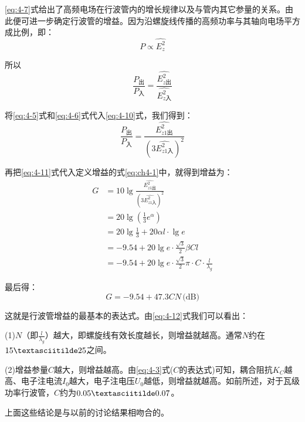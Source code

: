 \eqref{eq:4-7}式给出了高频电场在行波管内的增长规律以及与管内其它参量的关系。由此便可进一步确定行波管的增益。因为沿螺旋线传播的高频功率与其轴向电场平方成比例，即：
\begin{equation} \label{eq:4-9}
	P \propto \hat{E_z^2}
\end{equation}

所以
\begin{equation} \label{eq:4-10}
	\frac{P_\textrm{出}}{P_\textrm{入}} = \frac{\hat{E_{z\textrm{出}}^2}}{\hat{E_{z\textrm{入}}^2}}
\end{equation}

将\eqref{eq:4-5}式和\eqref{eq:4-6}式代入\eqref{eq:4-10}式，我们得到：
\begin{equation} \label{eq:4-11}
	\frac{P_\textrm{出}}{P_\textrm{入}} = \frac{\hat{E_{z1\textrm{出}}^2}}{(3\hat{E_{z1\textrm{入}}^2} )^2}
\end{equation}

再把\eqref{eq:4-11}式代入定义增益的式\eqref{eq:ch4-1}中，就得到增益为：
\begin{equation*}
	\begin{aligned}
	G &= 10\lg\frac{\hat{E_{z1\textrm{出}}^2}}{(3\hat{E_{z1\textrm{入}}^2} )^2}\\
	  &= 20\lg\left( \frac{1}{3}e^\alpha\right)\\
	  &= 20\lg\frac{1}{3} + 20\alpha l\cdot\lg e\\
	  &= -9.54 +20\lg e\cdot\frac{\sqrt{3}}{2}\beta Cl\\
	  &= -9.54 +20\lg e\cdot\frac{\sqrt{3}}{2}\pi\cdot C\cdot \frac{l}{\lambda_g}
	\end{aligned}
\end{equation*}

最后得：
\begin{equation} \label{eq:4-12}
	G = -9.54 + 47.3CN\,\textrm{(dB)}
\end{equation}

这就是行波管增益的最基本的表达式。由\eqref{eq:4-12}式我们可以看出：

(1)$ N $（即$ \frac{l}{\lambda_g}$）越大，即螺旋线有效长度越长，则增益就越高。通常$ N $约在$ 15\textasciitilde25 $之间。

(2)增益参量$ C $越大，则增益越高。由\eqref{eq:4-3}式($ C $的表达式)可知，耦合阻抗$ K_C $越高、电子注电流$ I_0 $越大，电子注电压$ U_0 $越低，则增益就越高。如前所述，对于瓦级功率行波管，$ C $约为$ 0.05\textasciitilde0.07 $。

上面这些结论是与以前的讨论结果相吻合的。

